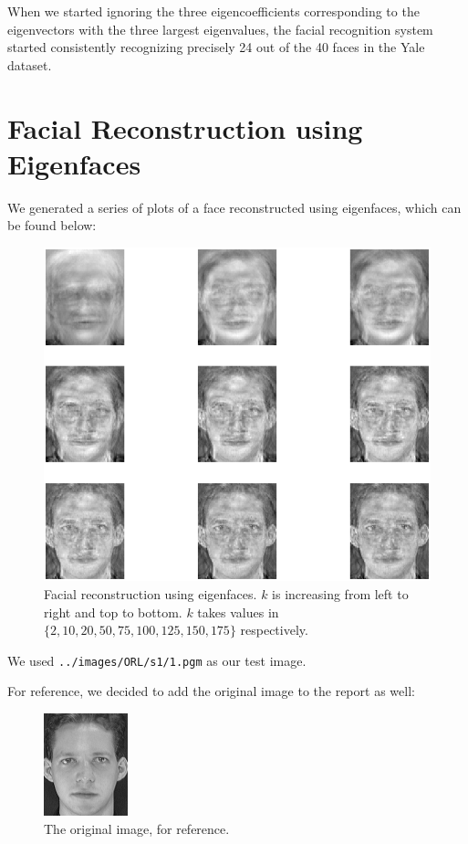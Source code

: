 \documentclass[a4paper]{article}
\begin{document}
When we started ignoring the three eigencoefficients corresponding to the eigenvectors with the three largest eigenvalues, the facial recognition system started consistently recognizing precisely 24 out of the 40 faces in the Yale dataset.

\section{Facial Reconstruction using Eigenfaces}

We generated a series of plots of a face reconstructed using eigenfaces, which can be found below:
\begin{figure}[H]
	\centering
	\includegraphics[width=\textwidth]{reconstruction.png}
	\caption{Facial reconstruction using eigenfaces. $k$ is increasing from left to right and top to bottom. $k$ takes values in $\{2, 10, 20, 50, 75, 100, 125, 150, 175\}$ respectively.}
\end{figure}

We used \texttt{../images/ORL/s1/1.pgm} as our test image.

\smallskip
For reference, we decided to add the original image to the report as well:
\begin{figure}[H]
	\centering
	\includegraphics[scale=1]{original.png}
	\caption{The original image, for reference.}
\end{figure}
\end{document}
